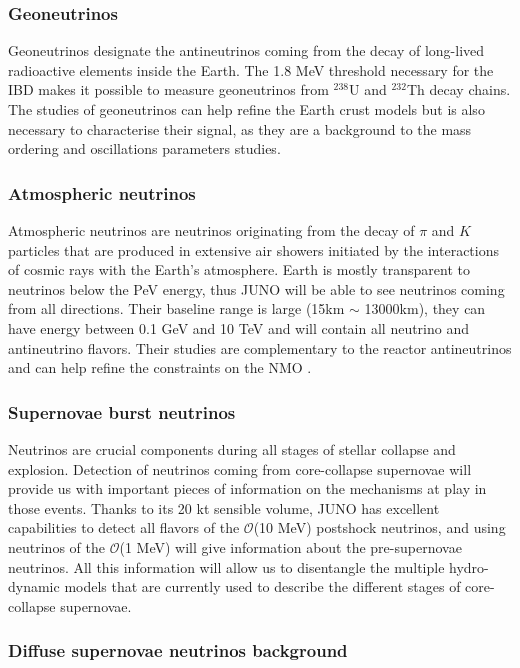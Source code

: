 \documentclass[../main.tex]{subfiles}
\begin{document}
\subsubsection{Geoneutrinos}

Geoneutrinos designate the antineutrinos coming from the decay of long-lived radioactive elements inside the Earth. The 1.8 MeV threshold necessary for the IBD makes it possible to measure geoneutrinos from $^{238}$U and $^{232}$Th decay chains. The studies of geoneutrinos can help refine the Earth crust models but is also necessary to characterise their signal, as they are a background to the mass ordering and oscillations parameters studies.

\subsubsection{Atmospheric neutrinos}

Atmospheric neutrinos are neutrinos originating from the decay of $\pi$ and $K$ particles that are produced in extensive air showers initiated by the interactions of cosmic rays with the Earth's atmosphere. Earth is mostly transparent to neutrinos below the PeV energy, thus JUNO will be able to see neutrinos coming from all directions. Their baseline range is large (15km $\sim$ 13000km), they can have energy between 0.1 GeV and 10 TeV and will contain all neutrino and antineutrino flavors. Their studies are complementary to the reactor antineutrinos and can help refine the constraints on the NMO \cite{an_neutrino_2016}.

\subsubsection{Supernovae burst neutrinos}

Neutrinos are crucial components during all stages of stellar collapse and explosion. Detection of neutrinos coming from core-collapse supernovae will provide us with important pieces of information on the mechanisms at play in those events.
Thanks to its 20 kt sensible volume, JUNO has excellent capabilities to detect all flavors of the $\mathcal{O}$(10 MeV) postshock neutrinos, and using neutrinos of the $\mathcal{O}$(1 MeV) will give information about the pre-supernovae neutrinos. All this information will allow us to disentangle the multiple hydro-dynamic models that are currently used to describe the different stages of core-collapse supernovae.

\subsubsection{Diffuse supernovae neutrinos background}
\end{document}
